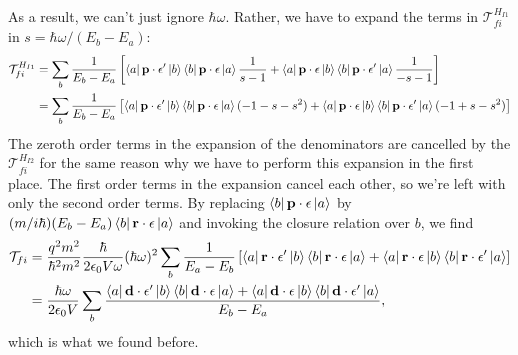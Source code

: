 \documentclass{article}
\theoremstyle{definition}
\newcommand{\f}[2]{\frac{#1}{#2}}
\newcommand{\lb}{\left[}
\newcommand{\rb}{\right]}
\begin{document}
\begin{enumerate}[label=(\alph*)]
As a result, we can't just ignore $\hbar \omega$. Rather, we have to expand the terms in $\mathcal{T}_{fi}^{H_{I1}}$ in $s = \hbar \omega / (E_b - E_a)$:
\begin{align*}
\mathcal{T}_{fi}^{H_{I1}}
&= 
\sum_b \f{1}{E_b - E_a}
 \lb 
 \bra{a} \mathbf{p}\cdot \mathbf{\epsilon'}  \ket{b} \bra{b}  \mathbf{p}\cdot \mathbf{\epsilon} \ket{a} \f{1}{s-1}
 +
 \bra{a}  \mathbf{p}\cdot \mathbf{\epsilon} \ket{b}\bra{b}  \mathbf{p}\cdot \mathbf{\epsilon'}  \ket{a}\f{1}{-s-1}
 \rb \\
 &= \sum_b \f{1}{E_b - E_a}
 \lb 
 \bra{a} \mathbf{p}\cdot \mathbf{\epsilon'}  \ket{b} \bra{b}  \mathbf{p}\cdot \mathbf{\epsilon} \ket{a} (-1-s-s^2)
 +
 \bra{a}  \mathbf{p}\cdot \mathbf{\epsilon} \ket{b}\bra{b}  \mathbf{p}\cdot \mathbf{\epsilon'}  \ket{a} (-1+s-s^2)
 \rb \\
\end{align*}
The zeroth order terms in the expansion of the denominators are cancelled by the $\mathcal{T}_{fi}^{H_{I2}}$ for the same reason why we have to perform this expansion in the first place. The first order terms in the expansion cancel each other, so we're left with only the second order terms. By replacing $\bra{b} \mathbf{p}\cdot \mathbf{\epsilon} \ket{a}$ by $(m/i\hbar) (E_b - E_a) \bra{b}  \mathbf{r}\cdot \mathbf{\epsilon}  \ket{a} $ and invoking the closure relation over $b$, we find 
\begin{align*}
\mathcal{T}_{fi} 
&= 
\f{q^2 m^2}{\hbar^2 m^2} \f{\hbar }{2\epsilon_0 V \omega} (\hbar \omega)^2
\sum_b \f{1}{E_a - E_b}
\lb 
 \bra{a} \mathbf{r}\cdot \mathbf{\epsilon'}  \ket{b} \bra{b}  \mathbf{r}\cdot \mathbf{\epsilon} \ket{a} 
 +
  \bra{a}  \mathbf{r}\cdot \mathbf{\epsilon} \ket{b}\bra{b}  \mathbf{r}\cdot \mathbf{\epsilon'}  \ket{a} 
\rb  \\
&= \f{\hbar \omega}{2\epsilon_0 V} \sum_b 
\f{
 \bra{a} \mathbf{d}\cdot \mathbf{\epsilon'}  \ket{b} \bra{b}  \mathbf{d}\cdot \mathbf{\epsilon} \ket{a} 
+
 \bra{a}  \mathbf{d}\cdot \mathbf{\epsilon} \ket{b}\bra{b}  \mathbf{d}\cdot \mathbf{\epsilon'}  \ket{a} 
}
{E_b - E_a},
\end{align*}
which is what we found before. 



\end{enumerate}
\end{document}
